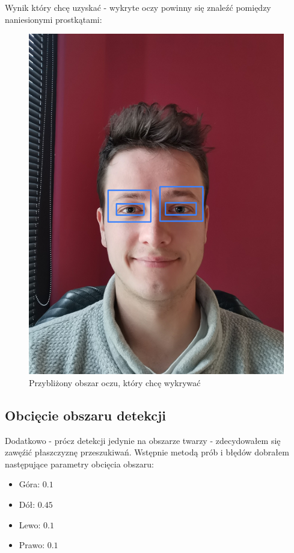 \documentclass[10pt, a4paper]{article}
\begin{document}
Wynik który chcę uzyskać - wykryte oczy powinny się znaleźć pomiędzy naniesionymi prostkątami:

\begin{figure}[H]
    \begin{center}
        \includegraphics[scale=0.6]{images/expected_eyes_region.png}
        \caption{Przybliżony obszar oczu, który chcę wykrywać}
        \label{fig:expected_eyes_region}
    \end{center}
\end{figure}

\subsection{Obcięcie obszaru detekcji}
Dodatkowo - prócz detekcji jedynie na obszarze twarzy - zdecydowałem się zawęźić płaszczyznę przeszukiwań.
Wstępnie metodą prób i błędów dobrałem następujące parametry obcięcia obszaru:
\begin{itemize}
    \item Góra: $0.1$
    \item Dół: $0.45$
    \item Lewo: $0.1$
    \item Prawo: $0.1$
\end{itemize}
\end{document}
